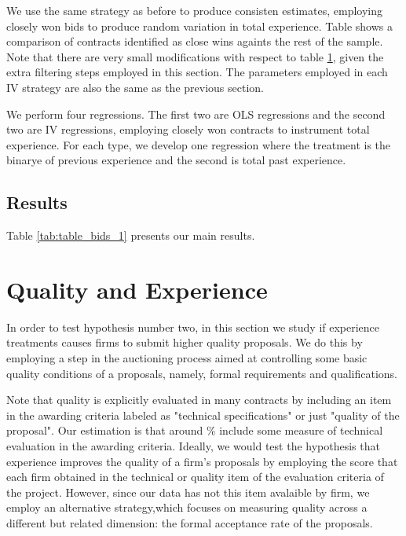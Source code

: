 We use the same strategy as before to produce consisten estimates, employing closely won bids to produce random variation in total experience. Table shows a comparison of contracts identified as close wins againts the rest of the sample. Note that there are very small modifications with respect to table \ref{}, given the extra filtering steps employed in this section. The parameters employed in each IV strategy are also the same as the previous section.

We perform four regressions. The first two are OLS regressions and the second two are IV regressions, employing closely won contracts to instrument total experience. For each type, we develop one regression where the treatment is the binarye of previous experience and the second is total past experience.

\subsection{Results}

Table \ref{tab:table_bids_1} presents our main results.





\section{Quality and Experience}
In order to test hypothesis number two, in this section we study if experience treatments causes firms to submit higher quality proposals. We do this by employing a step in the auctioning process aimed at controlling some basic quality conditions of a proposals, namely, formal requirements and qualifications.

Note that quality is explicitly evaluated in many contracts by including an item in the awarding criteria labeled as "technical specifications" or just "quality of the proposal". Our estimation is that around \% include some measure of technical evaluation in the awarding criteria.  Ideally, we would test the hypothesis that experience improves the quality of a firm's proposals by employing the score that each firm obtained in the technical or quality item of the evaluation criteria of the project. However, since our data has not this item avalaible by firm, we employ an alternative strategy,which focuses on measuring quality across a different but related dimension: the formal acceptance rate of the proposals.

